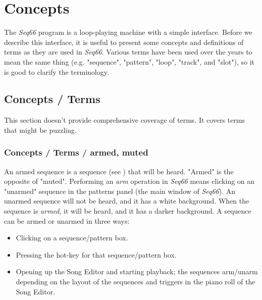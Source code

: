 %
%
%

\section{Concepts}
\label{sec:concepts}

   The \textsl{Seq66} program is a loop-playing machine with a 
   simple interface.  Before we describe this interface, it is useful
   to present some concepts and definitions of terms as
   they are used in \textsl{Seq66}.  Various terms have been used over
   the years to mean the same thing (e.g. "sequence", "pattern", "loop",
   "track", and "slot"), so it is good to clarify the terminology.

\subsection{Concepts / Terms}
\label{subsec:concepts_terms}

   This section doesn't provide comprehensive coverage of terms.  It
   covers terms that might be puzzling.

\subsubsection{Concepts / Terms / armed, muted}
\label{subsubsec:concepts_terms_armed}

   An armed sequence is a sequence
   (see )
   that will be heard.  "Armed" is the opposite
   of "muted".  Performing an \textsl{arm} operation in \textsl{Seq66}
   means clicking on an "unarmed" sequence in the patterns panel (the main
   window of \textsl{Seq66}).  An unarmed sequence will not be heard, and
   it has a white background.  When the sequence is \textsl{armed}, it will be
   heard, and it has a darker background.
   A sequence can be armed or unarmed in three ways:

   \begin{itemize}
      \item Clicking on a sequence/pattern box.
      \item Pressing the hot-key for that sequence/pattern box.
      \item Opening up the Song Editor and starting playback; the
            sequences arm/unarm depending on the layout of the
            sequences and triggers in the piano roll of the Song Editor.
   \end{itemize}

